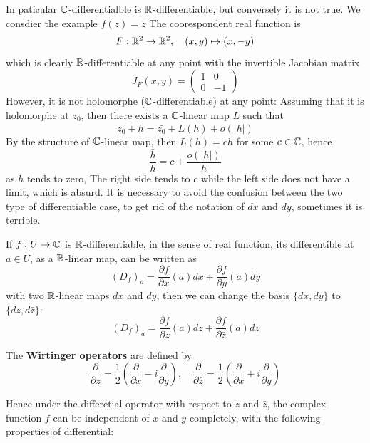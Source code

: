 \documentclass[12pt,a4paper]{article}
\begin{document}
In paticular \(\mathbb{C}\)-differentialble is \(\mathbb{R}\)-differentiable, but conversely it is not true. We consdier the example \(f(z) = \bar{z}\)
The coorespondent real function is
\[F: \mathbb{R}^2 \to \mathbb{R}^2, \quad (x,y) \mapsto (x,-y)\]
which is clearly \(\mathbb{R}\)-differentiable at any point with the invertible Jacobian matrix
\[J_F(x,y) = \begin{pmatrix}1 & 0 \\ 0 & -1\end{pmatrix}\]
However, it is not holomorphe (\(\mathbb{C}\)-differentiable) at any point: Assuming that it is holomorphe at \(z_0\), then there exists a \(\mathbb{C}\)-linear map \(L\) such that
\[\overline{z_0+h} = \bar{z_0} + L(h) + o(|h|)\]
By the structure of \(\mathbb{C}\)-linear map, then \(L(h)=ch\) for some \(c \in \mathbb{C}\), hence
\[\frac{\bar{h}}{h} = c + \frac{o(|h|)}{h}\]
as \(h\) tends to zero, The right side tends to \(c\) while the left side does not have a limit, which is absurd. It is necessary to avoid the confusion between the two type of differentiable case, to get rid of the notation of \(dx\) and \(dy\), sometimes it is terrible.

If \(f:U \to \mathbb{C}\) is \(\mathbb{R}\)-differentiable, in the sense of real function, its differentible at \(a \in U\), as a \(\mathbb{R}\)-linear map, can be written as
\[(D_f)_a = \frac{\partial f}{\partial x}(a) dx + \frac{\partial f}{\partial y}(a) dy\]
with two \(\mathbb{R}\)-linear maps \(dx\) and \(dy\), then we can change the basis \(\{dx, dy\}\) to \(\{dz, d\bar{z}\}\):
\[(D_f)_a = \frac{\partial f}{\partial z}(a) dz + \frac{\partial f}{\partial \bar{z}}(a) d\bar{z}\]

\begin{definition}
    The \textbf{Wirtinger operators} are defined by
    \[\frac{\partial}{\partial z} = \frac{1}{2}\left(\frac{\partial}{\partial x} - i \frac{\partial}{\partial y}\right), \quad \frac{\partial}{\partial \bar{z}} = \frac{1}{2}\left(\frac{\partial}{\partial x} + i \frac{\partial}{\partial y}\right)\]
\end{definition}

Hence under the differetial operator with respect to \(z\) and \(\bar{z}\), the complex function \(f\) can be independent of \(x\) and \(y\) completely, with the following properties of differential:
\end{document}
